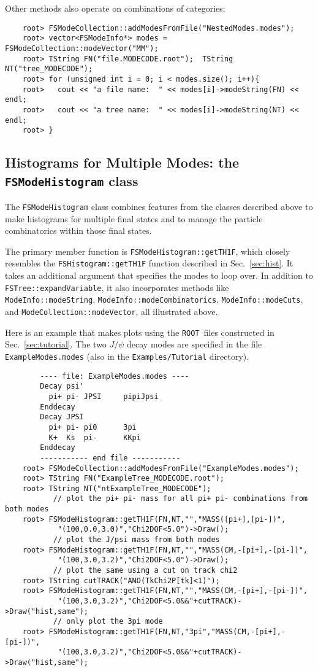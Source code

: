 \documentclass[11pt]{article}
\newcommand{\ROOT}{{\tt ROOT}}
\begin{document}
Other methods also operate on combinations of categories:
\begin{verbatim}
    root> FSModeCollection::addModesFromFile("NestedModes.modes");
    root> vector<FSModeInfo*> modes = FSModeCollection::modeVector("MM");
    root> TString FN("file.MODECODE.root");  TString NT("tree_MODECODE");
    root> for (unsigned int i = 0; i < modes.size(); i++){ 
    root>   cout << "a file name:  " << modes[i]->modeString(FN) << endl;
    root>   cout << "a tree name:  " << modes[i]->modeString(NT) << endl;
    root> }
\end{verbatim}


\subsection{Histograms for Multiple Modes: the {\tt FSModeHistogram} class}
\label{sec:modehist}

The {\tt FSModeHistogram} class combines features from the classes described above to make histograms for multiple final states and to manage the particle combinatorics within those final states.

The primary member function is {\tt FSModeHistogram::getTH1F}, which closely resembles the {\tt FSHistogram::getTH1F} function described in Sec.~\ref{sec:hist}.  It takes an additional argument that specifies the modes to loop over.  In addition to {\tt FSTree::expandVariable}, it also incorporates methods like {\tt ModeInfo::modeString}, {\tt ModeInfo::modeCombinatorics}, {\tt ModeInfo::modeCuts}, and {\tt ModeCollection::modeVector}, all illustrated above. 

Here is an example that makes plots using the \ROOT\ files constructed in Sec.~\ref{sec:tutorial}.  The two $J/\psi$ decay modes are specified in the file {\tt ExampleModes.modes} (also in the {\tt Examples/Tutorial} directory).  
\begin{verbatim}
        ---- file: ExampleModes.modes ----
        Decay psi'
          pi+ pi- JPSI     pipiJpsi
        Enddecay
        Decay JPSI
          pi+ pi- pi0      3pi
          K+  Ks  pi-      KKpi
        Enddecay
        ----------- end file -----------
    root> FSModeCollection::addModesFromFile("ExampleModes.modes");
    root> TString FN("ExampleTree_MODECODE.root");  
    root> TString NT("ntExampleTree_MODECODE");
           // plot the pi+ pi- mass for all pi+ pi- combinations from both modes  
    root> FSModeHistogram::getTH1F(FN,NT,"","MASS([pi+],[pi-])",
            "(100,0.0,3.0)","Chi2DOF<5.0")->Draw();
           // plot the J/psi mass from both modes  
    root> FSModeHistogram::getTH1F(FN,NT,"","MASS(CM,-[pi+],-[pi-])",
            "(100,3.0,3.2)","Chi2DOF<5.0")->Draw();
           // plot the same using a cut on track chi2
    root> TString cutTRACK("AND(TkChi2P[tk]<1)");
    root> FSModeHistogram::getTH1F(FN,NT,"","MASS(CM,-[pi+],-[pi-])",
            "(100,3.0,3.2)","Chi2DOF<5.0&&"+cutTRACK)->Draw("hist,same");
           // only plot the 3pi mode
    root> FSModeHistogram::getTH1F(FN,NT,"3pi","MASS(CM,-[pi+],-[pi-])",
            "(100,3.0,3.2)","Chi2DOF<5.0&&"+cutTRACK)->Draw("hist,same");
\end{verbatim}
\end{document}
